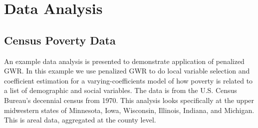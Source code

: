 \documentclass[authoryear, review, 11pt]{elsarticle}
\begin{document}

	


			
\section{Data Analysis\label{section:data-analysis}}
	\subsection{Census Poverty Data}
	An example data analysis is presented to demonstrate application of penalized GWR. In this example we use penalized GWR to do local variable selection and coefficient estimation for a  varying-coefficients model of how poverty is related to a list of demographic and social variables. The data is from the U.S. Census Bureau's decennial census  from 1970. This analysis looks specifically at the upper midwestern states of Minnesota, Iowa, Wisconsin, Illinois, Indiana, and Michigan. This is areal data, aggregated at the county level.
	
\end{document}
